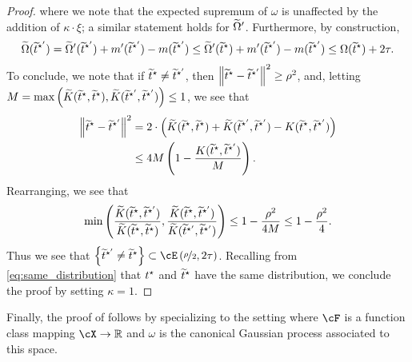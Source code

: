 \begin{proof}
    where we note that the expected supremum of $\omega$ is unaffected by the addition of $\kappa \cdot \xi$; a similar statement holds for $\widetilde{\Omega}'$.  Furthermore, by construction,  
    \begin{align}
        \widetilde{\Omega}(\widetilde{t}^{\star'}) = \widetilde{\Omega}'(\widetilde{t}^{\star'}) + m'(\widetilde{t}^{\star'}) - m(\widetilde{t}^{\star'}) \leq \widetilde{\Omega}'(\widetilde{t}^\star) +  m'(\widetilde{t}^{\star'}) - m(\widetilde{t}^{\star'}) \leq \Omega(\widetilde{t}^\star) + 2\tau.
    \end{align}
    To conclude, we note that if $\widetilde{t}^\star \neq \widetilde{t}^{\star'}$, then $\left\|\widetilde{t}^\star - \widetilde{t}^{\star'}\right\|^2 \geq \rho^2$, and, letting $M = \max\left( \widetilde{K}(\widetilde{t}^\star, \widetilde{t}^\star), \widetilde{K}(\widetilde{t}^{\star'}, \widetilde{t}^{\star'}) \right) \leq 1$, we see that
    \begin{align}
        \left\|\widetilde{t}^\star - \widetilde{t}^{\star'}\right\|^2 &= 2 \cdot \left( \widetilde{K}(\widetilde{t}^\star, \widetilde{t}^\star) + \widetilde{K}(\widetilde{t}^{\star'}, \widetilde{t}^{\star'}) - K(\widetilde{t}^\star, \widetilde{t}^{\star'}) \right) \\
        &\leq 4 M \left( 1 - \frac{K(\widetilde{t}^\star, \widetilde{t}^{\star'})}{M} \right).
    \end{align}
    Rearranging, we see that
    \begin{align}
        \min\left( \frac{\widetilde{K}(\widetilde{t}^\star, \widetilde{t}^{\star'})}{\widetilde{K}(\widetilde{t}^\star, \widetilde{t}^\star)}, \frac{\widetilde{K}(\widetilde{t}^\star, \widetilde{t}^{\star'})}{\widetilde{K}(\widetilde{t}^{\star'}, \widetilde{t}^{\star'})} \right) \leq 1 - \frac{\rho^2}{4M} \leq 1 - \frac{\rho^2}{4}.
    \end{align}
    Thus we see that $\left\{ \ttilstarp \neq \ttilstar \right\} \subset \cE\left( \nicefrac \rho2, 2\tau \right)$.  Recalling from \eqref{eq:same_distribution} that $t^\star$ and $\widetilde{t}^\star$ have the same distribution, we conclude the proof by setting $\kappa =1$.
















    
    
    
    
    
\end{proof}
Finally, the proof of  follows by specializing to the setting where $\cF$ is a function class mapping $\cX \to \rr$ and $\omega$ is the canonical Gaussian process associated to this space. 
